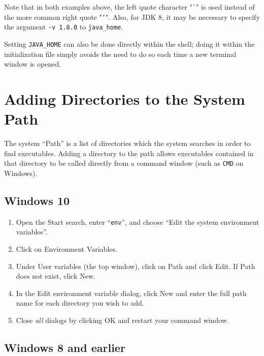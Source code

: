 \documentclass{article}
\begin{document}
Note that in both examples above, the left quote character "{\tt \`{}}" is used
instead of the more common right quote "{\tt '}".  Also, for JDK 8, it may be
necessary to specify the argument {\tt -v 1.8.0} to {\tt java\_home}.

Setting {\tt JAVA\_HOME} can also be done directly within the shell;
doing it within the initialization file simply avoids the need to do
so each time a new terminal window is opened.

\section{Adding Directories to the System Path}
\label{SettingPath}

The system ``Path'' is a list of directories which the system searches
in order to find executables. Adding a directory to the path allows
executables contained in that directory to be called directly from a
command window (such as {\tt CMD} on Windows).

\subsection{Windows 10}

\begin{enumerate}

\item Open the {\sf Start} search, enter ``{\tt env}'', and choose
{\sf ``Edit the system environment variables''}.

\item Click on {\sf Environment Variables}.

\item Under {\sf User variables} (the top window), click on {\sf Path}
and click {\sf Edit}. If {\sf Path} does not exist, click {\sf New}.

\item In the {\sf Edit environment variable} dialog, click {\sf New}
and enter the full path name for each directory you wish to add.

\item Close {\it all} dialogs by clicking {\sf OK} and restart 
your command window.

\end{enumerate}

\subsection{Windows 8 and earlier}
\end{document}
